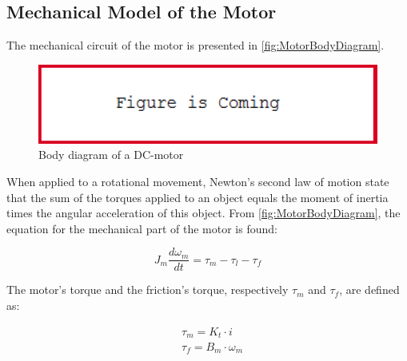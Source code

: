 \subsection*{Mechanical Model of the Motor}
The mechanical circuit of the motor is presented in \autoref{fig:MotorBodyDiagram}.

\begin{figure}[htbp]
	\centering
 	\includegraphics[width=1\textwidth]{figures/FigureIsComing.PNG} 
 	\caption{Body diagram of a DC-motor}
 	\label{fig:MotorBodyDiagram}
\end{figure}

When applied to a rotational movement, Newton's second law of motion state that the sum of the torques applied to an object equals the moment of inertia times the angular acceleration of this object. From \autoref{fig:MotorBodyDiagram}, the equation for the mechanical part of the motor is found:

\begin{equation}
	J_{m} \frac{d\omega_{m}}{dt} = \tau_{m} - \tau_{l} - \tau_f
	\label{eq:MotorMechanical}
\end{equation}

\startexplain
\stopexplain

The motor's torque and the friction's torque, respectively $\tau_m$ and $\tau_f$, are defined as:

\begin{subequations}
	\begin{flalign}
		&\tau_m = K_t \cdot i \label{eq:MotorTorque}\\	
		&\tau_f = B_{m}\cdot\omega_{m}	\label{eq:FrictionTorque}
	\end{flalign}
\end{subequations}

\startexplain
\stopexplain

